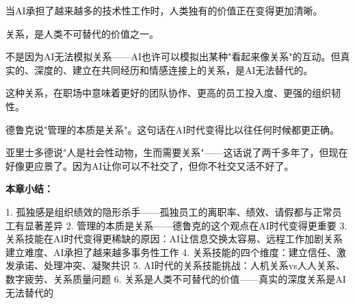 当AI承担了越来越多的技术性工作时，人类独有的价值正在变得更加清晰。

关系，是人类不可替代的价值之一。

不是因为AI无法模拟关系——AI也许可以模拟出某种"看起来像关系"的互动。但真实的、深度的、建立在共同经历和情感连接上的关系，是AI无法替代的。

这种关系，在职场中意味着更好的团队协作、更高的员工投入度、更强的组织韧性。

德鲁克说"管理的本质是关系"。这句话在AI时代变得比以往任何时候都更正确。

亚里士多德说"人是社会性动物，生而需要关系"——这话说了两千多年了，但现在好像更应景了。因为AI让你可以不社交了，但你不社交又活不好了。


\textbf{本章小结：}

1. 孤独感是组织绩效的隐形杀手——孤独员工的离职率、绩效、请假都与正常员工有显著差异
2. 管理的本质是关系——德鲁克的这个观点在AI时代变得更重要
3. 关系技能在AI时代变得更稀缺的原因：AI让信息交换太容易、远程工作加剧关系建立难度、AI承担了越来越多事务性工作
4. 关系技能的四个维度：建立信任、激发承诺、处理冲突、凝聚共识
5. AI时代的关系技能挑战：人机关系vs人人关系、数字疲劳、关系质量问题
6. 关系是人类不可替代的价值——真实的深度关系是AI无法替代的
